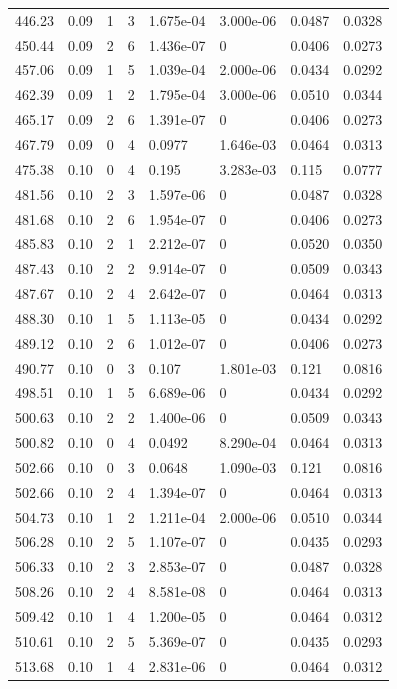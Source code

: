 \documentclass[preview]{standalone}
\begin{document}
{{{{{\begin{tabular}{L{1.2cm}C{1.2cm} C{0.3cm}C{0.5cm} C{1.4cm}C{1.4cm} C{1.4cm}C{1.4cm}}
  446.23  &  0.09  & 1     &  3 &  1.675e-04  & 3.000e-06  & 0.0487 &  0.0328   \\ 
  450.44  &  0.09  & 2     &  6 &  1.436e-07  & 0  & 0.0406 &  0.0273   \\ 
  457.06  &  0.09  & 1     &  5 &  1.039e-04  & 2.000e-06  & 0.0434 &  0.0292   \\ 
  462.39  &  0.09  & 1     &  2 &  1.795e-04  & 3.000e-06  & 0.0510 &  0.0344   \\ 
  465.17  &  0.09  & 2     &  6 &  1.391e-07  & 0  & 0.0406 &  0.0273   \\ 
  467.79  &  0.09  & 0     &  4 &  0.0977  & 1.646e-03  & 0.0464 &  0.0313   \\ 
  475.38  &  0.10  & 0     &  4 &  0.195  & 3.283e-03  & 0.115 &  0.0777   \\ 
  481.56  &  0.10  & 2     &  3 &  1.597e-06  & 0  & 0.0487 &  0.0328   \\ 
  481.68  &  0.10  & 2     &  6 &  1.954e-07  & 0  & 0.0406 &  0.0273   \\ 
  485.83  &  0.10  & 2     &  1 &  2.212e-07  & 0  & 0.0520 &  0.0350   \\ 
  487.43  &  0.10  & 2     &  2 &  9.914e-07  & 0  & 0.0509 &  0.0343   \\ 
  487.67  &  0.10  & 2     &  4 &  2.642e-07  & 0  & 0.0464 &  0.0313   \\ 
  488.30  &  0.10  & 1     &  5 &  1.113e-05  & 0  & 0.0434 &  0.0292   \\ 
  489.12  &  0.10  & 2     &  6 &  1.012e-07  & 0  & 0.0406 &  0.0273   \\ 
  490.77  &  0.10  & 0     &  3 &  0.107  & 1.801e-03  & 0.121 &  0.0816   \\ 
  498.51  &  0.10  & 1     &  5 &  6.689e-06  & 0  & 0.0434 &  0.0292   \\ 
  500.63  &  0.10  & 2     &  2 &  1.400e-06  & 0  & 0.0509 &  0.0343   \\ 
  500.82  &  0.10  & 0     &  4 &  0.0492  & 8.290e-04  & 0.0464 &  0.0313   \\ 
  502.66  &  0.10  & 0     &  3 &  0.0648  & 1.090e-03  & 0.121 &  0.0816   \\ 
  502.66  &  0.10  & 2     &  4 &  1.394e-07  & 0  & 0.0464 &  0.0313   \\ 
  504.73  &  0.10  & 1     &  2 &  1.211e-04  & 2.000e-06  & 0.0510 &  0.0344   \\ 
  506.28  &  0.10  & 2     &  5 &  1.107e-07  & 0  & 0.0435 &  0.0293   \\ 
  506.33  &  0.10  & 2     &  3 &  2.853e-07  & 0  & 0.0487 &  0.0328   \\ 
  508.26  &  0.10  & 2     &  4 &  8.581e-08  & 0  & 0.0464 &  0.0313   \\ 
  509.42  &  0.10  & 1     &  4 &  1.200e-05  & 0  & 0.0464 &  0.0312   \\ 
  510.61  &  0.10  & 2     &  5 &  5.369e-07  & 0  & 0.0435 &  0.0293   \\ 
  513.68  &  0.10  & 1     &  4 &  2.831e-06  & 0  & 0.0464 &  0.0312   \\ 
\hline 
\end{tabular} 

}}}}}
\end{document}

